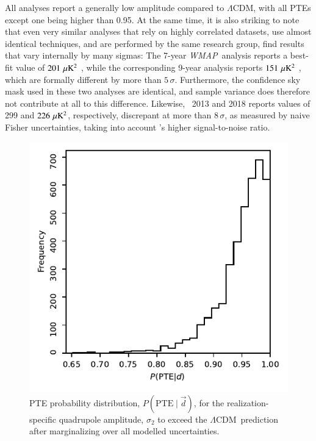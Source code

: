 \documentclass[twocolumn]{aa}
\def\WMAP{\textit{WMAP}}
\def\LCDM{$\Lambda$CDM}
\renewcommand{\d}[0]{\vec{d}}
\begin{document}
All analyses report a generally low amplitude compared to \LCDM, with
all PTEs except one being higher than 0.95. At the same time, it is
also striking to note that even very similar analyses that rely on
highly correlated datasets, use almost identical techniques,
and are performed by the same research group, find results that vary
internally by many sigmas: The 7-year \WMAP\ analysis reports a
best-fit value of $201\,\muK^2$ \citep{larson2010}, while the
corresponding 9-year analysis reports $151\,\muK^2$
\citep{hinshaw2012}, which are formally different by more than
$5\,\sigma$. Furthermore, the confidence sky mask used in these two
analyses are identical, and sample variance does therefore not
contribute at all to this difference. Likewise, \Planck\ 2013 and 2018
reports values of 299 and $226\,\muK^2$, respectively, discrepant at
more than $8\,\sigma$, as measured by naive Fisher uncertainties,
taking into account \Planck's higher signal-to-noise ratio.

\begin{figure}
  \includegraphics[width=\linewidth]{figs/C_2_PTE.pdf}
  \caption{PTE probability distribution, $P(\mathrm{PTE}\mid\d)$, for
    the realization-specific quadrupole amplitude, $\sigma_2$ to
    exceed the \LCDM\ prediction after marginalizing over all modelled
    uncertainties.}
  \label{fig:C_2_PTE}
\end{figure}
\end{document}
